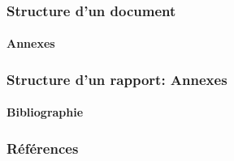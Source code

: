 \documentclass[xcolor=table]{beamer}
\begin{document}
\begin{frame}
\frametitle{Structure d'un document}
\framesubtitle{Annexes}

\end{frame}


\begin{frame}
\frametitle{Structure d'un rapport: Annexes}
\framesubtitle{Bibliographie}

\end{frame}



\begin{frame}
\frametitle{Références}

\tiny

%	
%	
	

\end{frame}

\nocite{*}
%
% 

%	
%	
\end{document}
